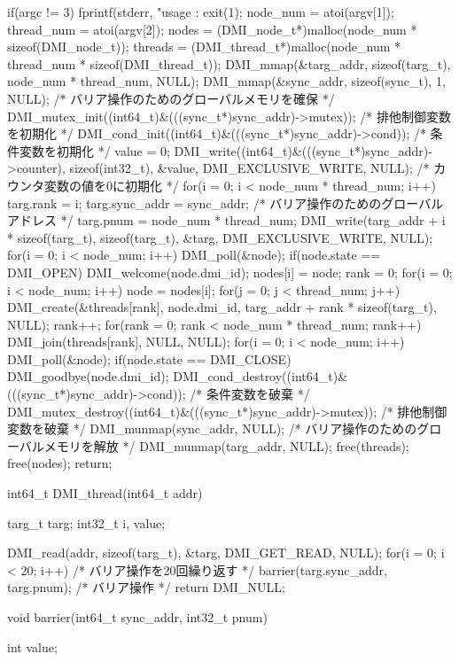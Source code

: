 \documentclass[report,12pt]{jsbook}
\begin{document}
\begin{code}
{  if(argc != 3)
    {
      fprintf(stderr, "usage : %
      exit(1);
    }
  node_num = atoi(argv[1]);
  thread_num = atoi(argv[2]); 
  nodes = (DMI_node_t*)malloc(node_num * sizeof(DMI_node_t));
  threads = (DMI_thread_t*)malloc(node_num * thread_num * sizeof(DMI_thread_t));
  DMI_mmap(&targ_addr, sizeof(targ_t), node_num * thread_num, NULL);
  DMI_mmap(&sync_addr, sizeof(sync_t), 1, NULL);  /* バリア操作のためのグローバルメモリを確保 */
  DMI_mutex_init((int64_t)&(((sync_t*)sync_addr)->mutex));  /* 排他制御変数を初期化 */
  DMI_cond_init((int64_t)&(((sync_t*)sync_addr)->cond));  /* 条件変数を初期化 */
  value = 0;
  DMI_write((int64_t)&(((sync_t*)sync_addr)->counter), sizeof(int32_t), &value, DMI_EXCLUSIVE_WRITE, NULL);  /* カウンタ変数の値を0に初期化 */
  for(i = 0; i < node_num * thread_num; i++)
    {
      targ.rank = i;
      targ.sync_addr = sync_addr;  /* バリア操作のためのグローバルアドレス */
      targ.pnum = node_num * thread_num;
      DMI_write(targ_addr + i * sizeof(targ_t), sizeof(targ_t), &targ, DMI_EXCLUSIVE_WRITE, NULL);
    }
  for(i = 0; i < node_num; i++)
    {
      DMI_poll(&node);
      if(node.state == DMI_OPEN)
        {
          DMI_welcome(node.dmi_id);
          nodes[i] = node;
        }
    }
  rank = 0;
  for(i = 0; i < node_num; i++)
    {
      node = nodes[i];
      for(j = 0; j < thread_num; j++)
        {
          DMI_create(&threads[rank], node.dmi_id, targ_addr + rank * sizeof(targ_t), NULL);
          rank++;
        }
    }
  for(rank = 0; rank < node_num * thread_num; rank++)
    {
      DMI_join(threads[rank], NULL, NULL);
    }
  for(i = 0; i < node_num; i++)
    {
      DMI_poll(&node);
      if(node.state == DMI_CLOSE)
        {
          DMI_goodbye(node.dmi_id);
        }
    }
  DMI_cond_destroy((int64_t)&(((sync_t*)sync_addr)->cond));  /* 条件変数を破棄 */
  DMI_mutex_destroy((int64_t)&(((sync_t*)sync_addr)->mutex));  /* 排他制御変数を破棄 */
  DMI_munmap(sync_addr, NULL);  /* バリア操作のためのグローバルメモリを解放 */
  DMI_munmap(targ_addr, NULL);
  free(threads);
  free(nodes);
  return;
}

int64_t DMI_thread(int64_t addr)
{
  targ_t targ;
  int32_t i, value;
  
  DMI_read(addr, sizeof(targ_t), &targ, DMI_GET_READ, NULL);
  for(i = 0; i < 20; i++)  /* バリア操作を20回繰り返す */
    {
      barrier(targ.sync_addr, targ.pnum);  /* バリア操作 */
    }
  return DMI_NULL;
}

void barrier(int64_t sync_addr, int32_t pnum)
{
  int value;
  
}
\end{code}
\end{document}
